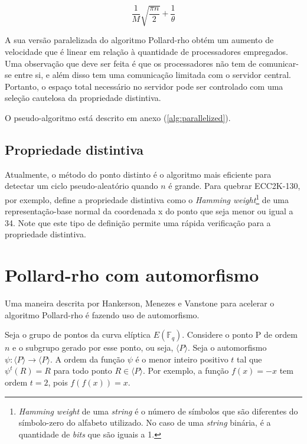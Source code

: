 \begin{equation}
\dfrac{1}{M} \sqrt{\dfrac{\pi n}{2}} + \dfrac{1}{\theta} \label{eq:execParallelized}
\end{equation}

A sua versão paralelizada do algoritmo Pollard-rho obtém um aumento de velocidade que é linear em relação à quantidade de processadores empregados. Uma observação que deve ser feita é que os processadores não tem de comunicar-se entre si, e além disso tem uma comunicação limitada com o servidor central. Portanto, o espaço total necessário no servidor pode ser controlado com uma seleção cautelosa da propriedade distintiva.

O pseudo-algoritmo está descrito em anexo (\ref{alg:parallelized}).

%
%
\subsection{Propriedade distintiva}
Atualmente, o método do ponto distinto é o algoritmo mais eficiente para detectar um ciclo pseudo-aleatório quando \(n\) é grande. Para quebrar ECC2K-130, por exemplo, \cite{Bailey:2009} define a propriedade distintiva como o \textit{Hamming weight}\footnote{\textit{Hamming weight} de uma \textit{string} é o número de símbolos que são diferentes do símbolo-zero do alfabeto utilizado. No caso de uma \textit{string} binária, é a quantidade de \textit{bits} que são iguais a 1.} de uma representação-base normal da coordenada x do ponto que seja menor ou igual a 34. Note que este tipo de definição permite uma rápida verificação para a propriedade distintiva.

%
%
\section{Pollard-rho com automorfismo}

Uma maneira descrita por Hankerson, Menezes e Vanstone para acelerar o algoritmo Pollard-rho é fazendo uso de automorfismo.\cite{Guide}

Seja o grupo de pontos da curva elíptica $E(\mathbb{F}_q)$. Considere o ponto P de ordem \(n\) e o subgrupo gerado por esse ponto, ou seja, $\langle P \rangle$. Seja o automorfismo $\psi: \langle P \rangle \to \langle P \rangle$. A ordem da função $\psi$ é o menor inteiro positivo $t$ tal que $\psi^t(R) = R$ para todo ponto $R \in \langle P \rangle$. Por exemplo, a função $f(x) = -x$ tem ordem $t = 2$, pois $f(f(x)) = x$.

